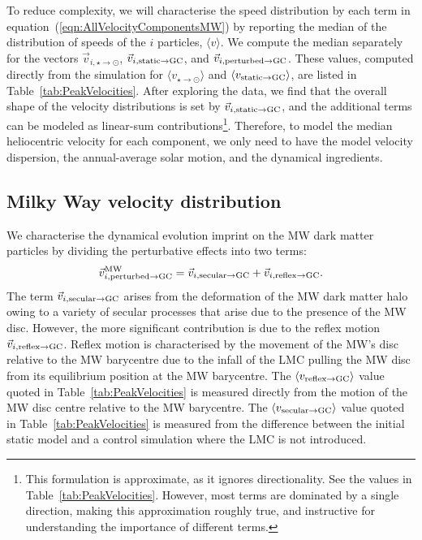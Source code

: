 \documentclass[fleqn,usenatbib]{mnras}
\begin{document}
To reduce complexity, we will characterise the speed distribution by each term in equation~(\ref{eqn:AllVelocityComponentsMW}) by reporting the median of the distribution of speeds of the $i$ particles, $\langle v \rangle$. We compute the median separately for the vectors $\vec{v}_{i,\star\to\odot}$, $\vec{v}_{i,{\rm static}\to {\rm GC}}$, and $\vec{v}_{i,{\rm perturbed}\to{\rm GC}}$. These values, computed directly from the simulation for $\langle v_{\star\to\odot}\rangle$ and $\langle v_{{\rm static}\to {\rm GC}}\rangle$, are listed in Table~\ref{tab:PeakVelocities}. After exploring the data, we find that the overall shape of the velocity distributions is set by $\vec{v}_{i,{\rm static}\to{\rm GC}}$, and the additional terms can be modeled as linear-sum contributions\footnote{This formulation is approximate, as it ignores directionality. See the values in Table~\ref{tab:PeakVelocities}. However, most terms are dominated by a single direction, making this approximation roughly true, and instructive for understanding the importance of different terms.}. Therefore, to model the median heliocentric velocity for each component, we only need to have the model velocity dispersion, the annual-average solar motion, and the dynamical ingredients. 


\vspace{-0.2cm}
\subsection{Milky Way velocity distribution}
\label{subsubsec:MWdist}

We characterise the dynamical evolution imprint on the MW dark matter particles by dividing the perturbative effects into two terms: 
\begin{equation}
\label{eqn:VelocityComponentsMW}
\vec{v}_{i,{\rm perturbed}\to{\rm GC}}^{\rm MW} = \vec{v}_{i,{\rm secular}\to{\rm GC}} + \vec{v}_{i,{\rm reflex}\to{\rm GC}}.
\end{equation}
The term $\vec{v}_{i,{\rm secular}\to{\rm GC}}$ arises from the deformation of the MW dark matter halo owing to a variety of secular processes \citep[e.g.][]{Petersen_2016} that arise due to the presence of the MW disc. However, the more significant contribution is due to the reflex motion $\vec{v}_{i,{\rm reflex}\to{\rm GC}}$. Reflex motion is characterised by the movement of the MW’s disc relative to the MW barycentre due to the infall of the LMC pulling the MW disc from its equilibrium position at the MW barycentre.
The $\langle v_{{\rm reflex}\to{\rm GC}}\rangle$ value quoted in Table~\ref{tab:PeakVelocities} is measured directly from the motion of the MW disc centre relative to the MW barycentre. The $\langle v_{{\rm secular}\to{\rm GC}}\rangle$ value quoted in Table~\ref{tab:PeakVelocities} is measured from the difference between the initial static model and a control simulation where the LMC is not introduced.
\end{document}
